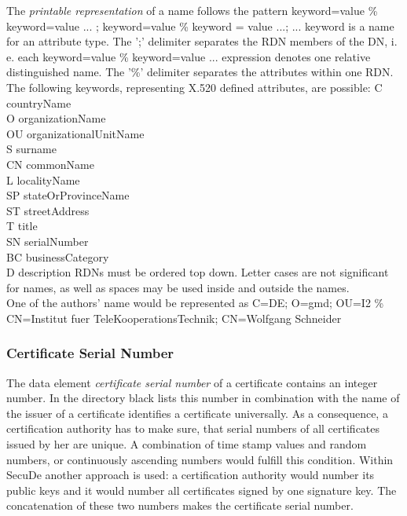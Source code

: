 The {\em printable representation} of a name follows the pattern
\bc
{\small keyword=value \% keyword=value ... ; keyword=value \% keyword = value ...; ...}
\ec
keyword is a name for an attribute type. 
The ';' delimiter separates the RDN members of the DN, i. e. each 
keyword=value \% keyword=value ... expression denotes one relative distinguished name.
The '\%' delimiter separates the attributes within one RDN.
The following keywords, representing X.520 defined attributes,  are possible:
{\small
\bvtab
C   \2 countryName \\
O   \2 organizationName  \\
OU  \2 organizationalUnitName \\
S   \2 surname \\
CN  \2 commonName \\
L   \2 localityName \\
SP  \2 stateOrProvinceName \\
ST  \2 streetAddress \\
T   \2 title \\
SN  \2 serialNumber \\
BC  \2 businessCategory \\
D   \2 description
\evtab
}
RDNs must be ordered top down. Letter cases are not significant for names, 
as well as spaces may be used inside and outside the names.
\\ [1ex]
One of the authors' name would be represented as
{\small
C=DE; O=gmd; OU=I2 \% CN=Institut fuer TeleKooperationsTechnik; CN=Wolfgang Schneider} 

\subsubsection{Certificate Serial Number}
\label{sc-csn}
 
The data element {\em certificate serial number} of a certificate
contains an integer number. In the directory black lists
this number in combination with the name of the issuer of a certificate
identifies a certificate universally.
As a consequence, a certification authority has to make sure,
that serial numbers of all certificates issued by her are unique.
A combination of time stamp values and random numbers,
or continuously ascending numbers would fulfill this condition.
Within SecuDe
another approach is used:
a certification authority would number its public keys
and it would number all certificates signed by one signature key.
The concatenation of these two numbers makes the certificate serial number.

